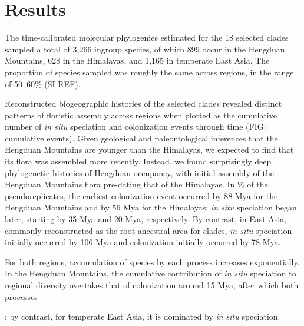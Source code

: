 \section{Results}

The time-calibrated molecular phylogenies estimated for the 18 selected clades sampled a total of 3,266 ingroup species, of which 899 occur in the Hengduan Mountains, 628 in the Himalayas, and 1,165 in temperate East Asia. The proportion of species sampled was roughly the same across regions, in the range of 50--60\% (SI REF).

Reconstructed biogeographic histories of the selected clades revealed distinct patterns of floristic assembly across regions when plotted as the cumulative number of \textit{in situ} speciation and colonization events through time (FIG: cumulative events). Given geological and paleontological inferences that the Hengduan Mountains are younger than the Himalayas, we expected to find that its flora was assembled more recently. Instead, we found surprisingly deep phylogenetic histories of Hengduan occupancy, with initial assembly of the Hengduan Mountains flora pre-dating that of the Himalayas. In \% of the pseudoreplicates, the earliest colonization event occurred by 88 Mya for the Hengduan Mountains and by 56 Mya for the Himalayas; \textit{in situ} speciation began later, starting by 35 Mya and 20 Mya, respectively. By contrast, in East Asia, commonly reconstructed as the root ancestral area for clades, \textit{in situ} speciation initially occurred by 106 Mya and colonization initially occurred by 78 Mya.

For both regions, accumulation of species by each process  increases exponentially. In the Hengduan Mountains, the cumulative contribution of \textit{in situ} speciation to regional diversity overtakes that of colonization around 15 Mya, after which both processes 

; by contrast, for temperate East Asia, it is dominated by \textit{in situ} speciation. 